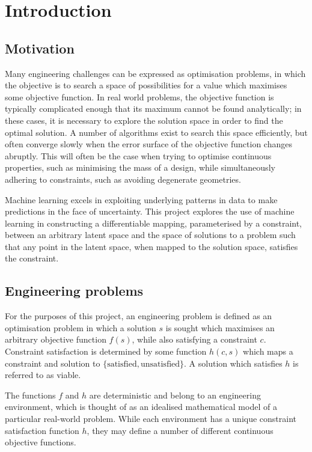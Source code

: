 \documentclass[../../main.tex]{subfiles}
\begin{document}
\chapter{Introduction} \label{chapter:introduction}

\section{Motivation} \label{section:motivation}

Many engineering challenges can be expressed as optimisation problems, in which the objective is to search a space of possibilities for a value which maximises some objective function.
In real world problems, the objective function is typically complicated enough that its maximum cannot be found analytically; in these cases, it is necessary to explore the solution space in order to find the optimal solution.
A number of algorithms exist to search this space efficiently, but often converge slowly when the error surface of the objective function changes abruptly.
This will often be the case when trying to optimise continuous properties, such as minimising the mass of a design, while simultaneously adhering to constraints, such as avoiding degenerate geometries.

Machine learning excels in exploiting underlying patterns in data to make predictions in the face of uncertainty.
This project explores the use of machine learning in constructing a differentiable mapping, parameterised by a constraint, between an arbitrary latent space and the space of solutions to a problem such that any point in the latent space, when mapped to the solution space, satisfies the constraint.

\section{Engineering problems} \label{section:engineeringProblems}

For the purposes of this project, an engineering problem is defined as an optimisation problem in which a solution $s$ is sought which maximises an arbitrary objective function $f(s)$, while also satisfying a constraint $c$.
Constraint satisfaction is determined by some function $h(c,s)$ which maps a constraint and solution to $\{\text{satisfied},\text{unsatisfied}\}$.
A solution which satisfies $h$ is referred to as viable.

The functions $f$ and $h$ are deterministic and belong to an engineering environment, which is thought of as an idealised mathematical model of a particular real-world problem.
While each environment has a unique constraint satisfaction function $h$, they may define a number of different continuous objective functions.
\end{document}
